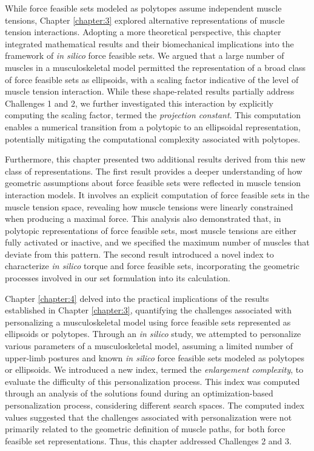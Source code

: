 While force feasible sets modeled as polytopes assume independent muscle tensions, Chapter \ref{chapter:3} explored alternative representations of muscle tension interactions. Adopting a more theoretical perspective, this chapter integrated mathematical results and their biomechanical implications into the framework of \emph{in silico} force feasible sets. We argued that a large number of muscles in a musculoskeletal model permitted the representation of a broad class of force feasible sets as ellipsoids, with a scaling factor indicative of the level of muscle tension interaction. While these shape-related results partially address Challenges 1 and 2, we further investigated this interaction by explicitly computing the scaling factor, termed the \emph{projection constant}. This computation enables a numerical transition from a polytopic to an ellipsoidal representation, potentially mitigating the computational complexity associated with polytopes.

Furthermore, this chapter presented two additional results derived from this new class of representations. The first result provides a deeper understanding of how geometric assumptions about force feasible sets were reflected in muscle tension interaction models. It involves an explicit computation of force feasible sets in the muscle tension space, revealing how muscle tensions were linearly constrained when producing a maximal force. This analysis also demonstrated that, in polytopic representations of force feasible sets, most muscle tensions are either fully activated or inactive, and we specified the maximum number of muscles that deviate from this pattern. The second result introduced a novel index to characterize \emph{in silico} torque and force feasible sets, incorporating the geometric processes involved in our set formulation into its calculation.

Chapter \ref{chapter:4} delved into the practical implications of the results established in Chapter \ref{chapter:3}, quantifying the challenges associated with personalizing a musculoskeletal model using force feasible sets represented as ellipsoids or polytopes. Through an \emph{in silico} study, we attempted to personalize various parameters of a musculoskeletal model, assuming a limited number of upper-limb postures and known \emph{in silico} force feasible sets modeled as polytopes or ellipsoids. We introduced a new index, termed the \emph{enlargement complexity}, to evaluate the difficulty of this personalization process. This index was computed through an analysis of the solutions found during an optimization-based personalization process, considering different search spaces. The computed index values suggested that the challenges associated with personalization were not primarily related to the geometric definition of muscle paths, for both force feasible set representations. Thus, this chapter addressed Challenges 2 and 3.

